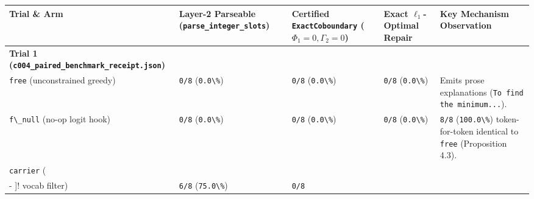 \documentclass[
  11pt,
]{article}
\newcommand{\passthrough}[1]{#1}
\begin{document}
\begin{longtable}[]{@{}
  >{\raggedright\arraybackslash}p{}
  >{\raggedright\arraybackslash}p{}
  >{\raggedright\arraybackslash}p{}
  >{\raggedright\arraybackslash}p{}
  >{\raggedright\arraybackslash}p{}@{}}
\toprule\noalign{}
\begin{minipage}[b]{\linewidth}\raggedright
Trial \& Arm
\end{minipage} & \begin{minipage}[b]{\linewidth}\raggedright
Layer-2 Parseable (\nolinkurl{parse_integer_slots})
\end{minipage} & \begin{minipage}[b]{\linewidth}\raggedright
Certified \nolinkurl{ExactCoboundary}
(\(\Phi_1 = 0,\allowbreak  \Gamma_2 = 0\))
\end{minipage} & \begin{minipage}[b]{\linewidth}\raggedright
Exact \(\ell_1\)-Optimal Repair
\end{minipage} & \begin{minipage}[b]{\linewidth}\raggedright
Key Mechanism Observation
\end{minipage} \\
\midrule\noalign{}
\endhead
\bottomrule\noalign{}
\endlastfoot
\textbf{Trial 1 (\nolinkurl{c004_paired_benchmark_receipt.json})} & & &
& \\
\passthrough{\lstinline!free!} (unconstrained greedy) &
\passthrough{\lstinline!0/8!} (\passthrough{\lstinline!0.0\%!}) &
\passthrough{\lstinline!0/8!} (\passthrough{\lstinline!0.0\%!}) &
\passthrough{\lstinline!0/8!} (\passthrough{\lstinline!0.0\%!}) & Emits
prose explanations
(\passthrough{\lstinline!To find the minimum...!}). \\
\passthrough{\lstinline!f\_null!} (no-op logit hook) &
\passthrough{\lstinline!0/8!} (\passthrough{\lstinline!0.0\%!}) &
\passthrough{\lstinline!0/8!} (\passthrough{\lstinline!0.0\%!}) &
\passthrough{\lstinline!0/8!} (\passthrough{\lstinline!0.0\%!}) &
\passthrough{\lstinline!8/8!} (\passthrough{\lstinline!100.0\%!})
token-for-token identical to \passthrough{\lstinline!free!} (Proposition
4.3). \\
\passthrough{\lstinline!carrier!} (\passthrough{\lstinline![0-9\\- ]!}
vocab filter) & \passthrough{\lstinline!6/8!}
(\passthrough{\lstinline!75.0\%!}) & \passthrough{\lstinline!0/8!}

\end{longtable}
\end{document}
